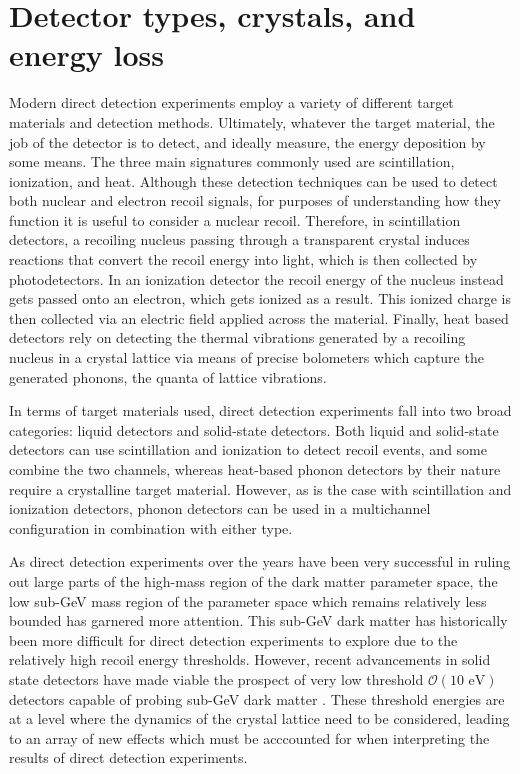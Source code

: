 \documentclass[b5paper, 10pt, twoside]{book}
\begin{document}
\chapter{Detector types, crystals, and energy loss}
\label{chap:energy-loss}

Modern direct detection experiments employ a variety of different target materials and detection methods. Ultimately, whatever the target material, the job of the detector is to detect, and ideally measure, the energy deposition by some means. The three main signatures commonly used are scintillation, ionization, and heat. Although these detection techniques can be used to detect both nuclear and electron recoil signals, for purposes of understanding how they function it is useful to consider a nuclear recoil. Therefore, in scintillation detectors, a recoiling nucleus passing through a transparent crystal induces reactions that convert the recoil energy into light, which is then collected by photodetectors. In an ionization detector the recoil energy of the nucleus instead gets passed onto an electron, which gets ionized as a result. This ionized charge is then collected via an electric field applied across the material. Finally, heat based detectors rely on detecting the thermal vibrations generated by a recoiling nucleus in a crystal lattice via means of precise bolometers which capture the generated phonons, the quanta of lattice vibrations.

In terms of target materials used, direct detection experiments fall into two broad categories: liquid detectors and solid-state detectors. Both liquid and solid-state detectors can use scintillation and ionization to detect recoil events, and some combine the two channels, whereas heat-based phonon detectors by their nature require a crystalline target material. However, as is the case with scintillation and ionization detectors, phonon detectors can be used in a multichannel configuration in combination with either type.

As direct detection experiments over the years have been very successful in ruling out large parts of the high-mass region of the dark matter parameter space, the low sub-GeV mass region of the parameter space which remains relatively less bounded has garnered more attention. This sub-GeV dark matter has historically been more difficult for direct detection experiments to explore due to the relatively high recoil energy thresholds. However, recent advancements in solid state detectors have made viable the prospect of very low threshold $\mathcal{O}(\text{10 eV})$ detectors capable of probing sub-GeV dark matter \parencites{RomaniEtAl2018, CrislerEtAl2018, EDELWEISS2020}. These threshold energies are at a level where the dynamics of the crystal lattice need to be considered, leading to an array of new effects which must be acccounted for when interpreting the results of direct detection experiments.
\end{document}
